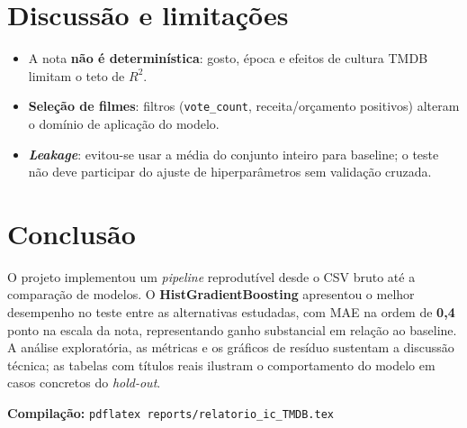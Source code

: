 \documentclass[11pt,a4paper]{article}
\begin{document}
\section{Discussão e limitações}

\begin{itemize}
  \item A nota \textbf{não é determinística}: gosto, época e efeitos de cultura TMDB limitam o teto de $R^2$.
  \item \textbf{Seleção de filmes}: filtros (\texttt{vote\_count}, receita/orçamento positivos) alteram o domínio de aplicação do modelo.
  \item \textbf{\emph{Leakage}}: evitou-se usar a média do conjunto inteiro para baseline; o teste não deve participar do ajuste de hiperparâmetros sem validação cruzada.
\end{itemize}

\section{Conclusão}

O projeto implementou um \emph{pipeline} reprodutível desde o CSV bruto até a comparação de modelos. O \textbf{HistGradientBoosting} apresentou o melhor desempenho no teste entre as alternativas estudadas, com MAE na ordem de \textbf{0{,}4} ponto na escala da nota, representando ganho substancial em relação ao baseline. A análise exploratória, as métricas e os gráficos de resíduo sustentam a discussão técnica; as tabelas com títulos reais ilustram o comportamento do modelo em casos concretos do \emph{hold-out}.

\vspace{1em}
\noindent\textbf{Compilação:} \texttt{pdflatex reports/relatorio\_ic\_TMDB.tex}
\end{document}
